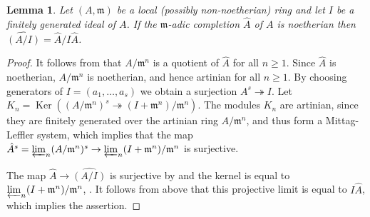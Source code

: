 \documentclass{amsart}
\newtheorem{lem}[prop]{Lemma}
\theoremstyle{definition}
\theoremstyle{remark}
\DeclareMathOperator{\Ker}{Ker}
\newcommand{\mm}{\mathfrak m}
\begin{document}
\begin{lem}\label{completion} Let $(A, \mm)$ be a local (possibly non-noetherian) ring and let $I$ be a finitely generated ideal of $A$. If the $\mm$-adic completion $\hat{A}$ of $A$ is noetherian then $\widehat{(A/I)}= \hat{A}/ I\hat{A}$.
\end{lem}
\begin{proof} It follows from \cite[\href{https://stacks.math.columbia.edu/tag/0BNG}{Tag 0BNG}]{stacks-project} that $A/\mm^n$ is a quotient of $\hat{A}$
for all $n\ge 1$. Since $\hat{A}$ is noetherian, $A/\mm^n$ is noetherian, and hence artinian for all $n\ge 1$. By choosing 
generators of $I=(a_1, \ldots, a_s)$ we obtain a surjection 
$A^s\twoheadrightarrow I$. Let $K_n= \Ker( (A/\mm^n)^s \twoheadrightarrow (I+\mm^n)/\mm^n)$. The modules  $K_n$ are artinian, 
since they are finitely generated over the artinian ring $A/\mm^n$, and thus form a Mittag-Leffler system, which implies that the 
map $\hat{A}^s= \varprojlim_n (A/\mm^n)^s\rightarrow \varprojlim_n (I +\mm^n)/\mm^n$ is surjective.  

The map $\hat{A}\rightarrow \widehat{(A/I)}$ is surjective by \cite[\href{https://stacks.math.columbia.edu/tag/0315}{Tag 0315}]{stacks-project} and the kernel is equal to $\varprojlim_n (I +\mm^n)/\mm^n$, \cite[\href{https://stacks.math.columbia.edu/tag/02N1}{Tag 02N1}]{stacks-project}. It follows from above that this projective limit is 
equal to $I \hat{A}$, which implies the assertion.
\end{proof}
\end{document}
